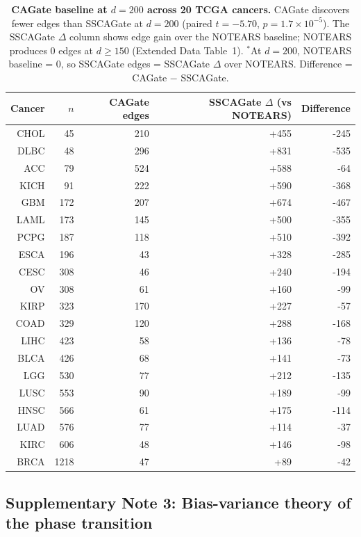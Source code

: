\documentclass[12pt,a4paper]{article}
\begin{document}
\begin{table}[htbp]
\centering
\caption{\textbf{CAGate baseline at $d = 200$ across 20 TCGA cancers.}
CAGate discovers fewer edges than SSCAGate at $d=200$ (paired $t = -5.70$, $p = 1.7 \times 10^{-5}$). The SSCAGate $\Delta$ column shows edge gain over the NOTEARS baseline; NOTEARS produces 0 edges at $d \geq 150$ (Extended Data Table~1). $^*$At $d=200$, NOTEARS baseline = 0, so SSCAGate edges = SSCAGate $\Delta$ over NOTEARS. Difference = CAGate $-$ SSCAGate.}
\label{tab:note2_cagate}
\begin{tabular}{rrrrr}
\toprule
Cancer & $n$ & CAGate edges & SSCAGate $\Delta$ (vs NOTEARS) & Difference \\
\midrule
CHOL & 45 & 210 & +455 & -245 \\
DLBC & 48 & 296 & +831 & -535 \\
ACC  & 79 & 524 & +588 & -64 \\
KICH & 91 & 222 & +590 & -368 \\
GBM  & 172 & 207 & +674 & -467 \\
LAML & 173 & 145 & +500 & -355 \\
PCPG & 187 & 118 & +510 & -392 \\
ESCA & 196 & 43  & +328 & -285 \\
CESC & 308 & 46  & +240 & -194 \\
OV   & 308 & 61  & +160 & -99 \\
KIRP & 323 & 170 & +227 & -57 \\
COAD & 329 & 120 & +288 & -168 \\
LIHC & 423 & 58  & +136 & -78 \\
BLCA & 426 & 68  & +141 & -73 \\
LGG  & 530 & 77  & +212 & -135 \\
LUSC & 553 & 90  & +189 & -99 \\
HNSC & 566 & 61  & +175 & -114 \\
LUAD & 576 & 77  & +114 & -37 \\
KIRC & 606 & 48  & +146 & -98 \\
BRCA & 1218& 47  & +89  & -42 \\\bottomrule
\end{tabular}
\end{table}


\subsection{Supplementary Note 3: Bias-variance theory of the phase transition}
\label{sec:note3}
\end{document}

